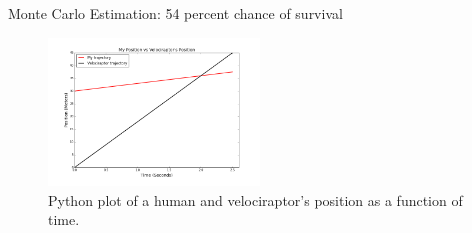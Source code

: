 \documentclass[twocolumn]{revtex4}
\begin{document}
Monte Carlo Estimation: 54 percent chance of survival

\begin{figure}
    \centering
    \includegraphics[width=0.5\textwidth]{humanvelociraptorpositionvstime.png}
    \caption{Python plot of a human and velociraptor's position as a function of time. \label{fig:siena}}
\end{figure}
\end{document}
